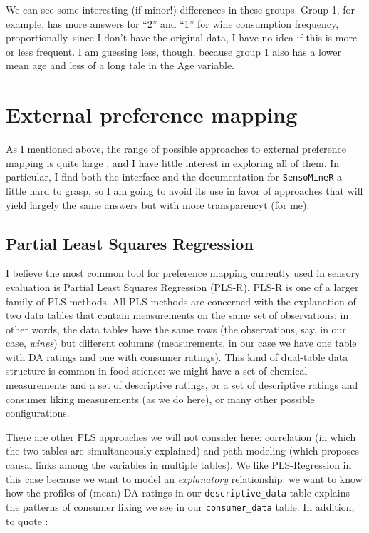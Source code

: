 \documentclass[
]{book}
\begin{document}
We can see some interesting (if minor!) differences in these groups. Group 1, for example, has more answers for ``2'' and ``1'' for wine consumption frequency, proportionally--since I don't have the original data, I have no idea if this is more or less frequent. I am guessing less, though, because group 1 also has a lower mean age and less of a long tale in the Age variable.

\section{External preference mapping}\label{external-preference-mapping}

As I mentioned above, the range of possible approaches to external preference mapping is quite large \citep{yenketCOMPARISON2011}, and I have little interest in exploring all of them. In particular, I find both the interface and the documentation for \texttt{SensoMineR} a little hard to grasp, so I am going to avoid its use in favor of approaches that will yield largely the same answers but with more transparencyt (for me).

\subsection{Partial Least Squares Regression}\label{partial-least-squares-regression}

I believe the most common tool for preference mapping currently used in sensory evaluation is Partial Least Squares Regression (PLS-R). PLS-R is one of a larger family of PLS methods. All PLS methods are concerned with the explanation of two data tables that contain measurements on the same set of observations: in other words, the data tables have the same rows (the observations, say, in our case, \emph{wines}) but different columns (measurements, in our case we have one table with DA ratings and one with consumer ratings). This kind of dual-table data structure is common in food science: we might have a set of chemical measurements and a set of descriptive ratings, or a set of descriptive ratings and consumer liking measurements (as we do here), or many other possible configurations.

There are other PLS approaches we will not consider here: correlation (in which the two tables are simultaneously explained) and path modeling (which proposes causal links among the variables in multiple tables). We like PLS-Regression in this case because we want to model an \emph{explanatory} relationship: we want to know how the profiles of (mean) DA ratings in our \texttt{descriptive\_data} table explains the patterns of consumer liking we see in our \texttt{consumer\_data} table. In addition, to quote \citet[567]{abdiPartial2013}:
\end{document}
